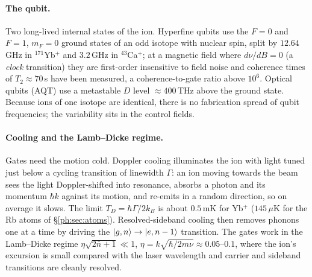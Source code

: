 \paragraph{The qubit.} Two long-lived internal states of the ion. Hyperfine qubits use the
$F=0$ and $F=1$, $m_F=0$ ground states of an odd isotope with nuclear spin, split by
$12.64$\,GHz in $^{171}$Yb$^+$ and $3.2$\,GHz in $^{43}$Ca$^+$; at a magnetic field where
$d\nu/dB=0$ (a \emph{clock} transition) they are first-order insensitive to field noise and
coherence times of $T_2\approx70$\,s have been measured, a coherence-to-gate ratio above $10^6$.
Optical qubits (AQT) use a metastable $D$ level $\approx400$\,THz above the ground state.
Because ions of one isotope are identical, there is no fabrication spread of qubit frequencies;
the variability sits in the control fields.

\paragraph{Cooling and the Lamb--Dicke regime.} Gates need the motion cold. Doppler cooling
illuminates the ion with light tuned just below a cycling transition of linewidth $\Gamma$: an ion
moving towards the beam sees the light Doppler-shifted into resonance, absorbs a photon and its
momentum $\hbar k$ against its motion, and re-emits in a random direction, so on average it slows.
The limit $T_D=\hbar\Gamma/2k_B$ is about $0.5$\,mK for Yb$^+$ ($145\,\mu$K for the Rb atoms of
\S\ref{ph:sec:atoms}). Resolved-sideband cooling then removes phonons one at a time by driving the
$\lvert g,n \rangle\to\lvert e,n-1 \rangle$ transition. The gates work in the Lamb--Dicke regime
$\eta\sqrt{2\bar n+1}\ll1$, $\eta=k\sqrt{\hbar/2m\nu}\approx0.05$--$0.1$, where the ion's
excursion is small compared with the laser wavelength and carrier and sideband transitions are
cleanly resolved.

